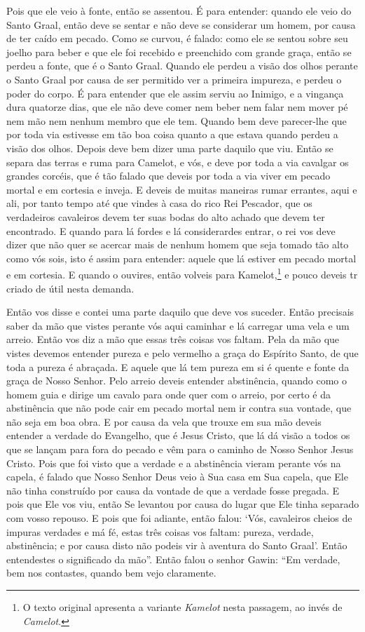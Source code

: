 Pois que ele veio à fonte, então se assentou. É para entender: quando ele veio
do Santo Graal, então deve se sentar e não deve se considerar um homem, por
causa de ter caído em pecado. Como se curvou, é falado: como ele se sentou
sobre seu joelho para beber e que ele foi recebido e preenchido com grande
graça, então se perdeu a fonte, que é o Santo Graal. Quando ele perdeu a visão
dos olhos perante o Santo Graal por causa de ser permitido ver a primeira
impureza, e perdeu o poder do corpo. É para entender que ele assim serviu ao
Inimigo, e a vingança dura quatorze dias, que ele não deve comer nem beber nem
falar nem mover pé nem mão nem nenhum membro que ele tem. Quando bem deve
parecer-lhe que por toda via estivesse em tão boa coisa quanto a que estava
quando perdeu a visão dos olhos. Depois deve bem dizer uma parte daquilo que
viu. Então se separa das terras e ruma para Camelot, e vós, e deve por toda a
via cavalgar os grandes corcéis, que é tão falado que deveis por toda a via
viver em pecado mortal e em cortesia e inveja. E deveis de muitas maneiras
rumar errantes, aqui e ali, por tanto tempo até que vindes à casa do rico Rei
Pescador, que os verdadeiros cavaleiros devem ter suas bodas do alto achado que
devem ter encontrado. E quando para lá fordes e lá considerardes entrar, o rei
vos deve dizer que não quer se acercar mais de nenhum homem que seja tomado tão
alto como vós sois, isto é assim para entender: aquele que lá estiver em pecado
mortal e em cortesia. E quando o ouvires, então volveis para Kamelot,\footnote{
O texto original apresenta a variante \textit{Kamelot} nesta passagem, ao invés
de \textit{Camelot}.} e pouco deveis tr criado de útil nesta demanda. 

 Então vos disse e contei uma parte daquilo que deve vos suceder. Então
precisais saber da mão que vistes perante vós aqui caminhar e lá carregar uma
vela e um arreio. Então vos diz a mão que essas três coisas vos faltam. Pela da
mão que vistes devemos entender pureza e pelo vermelho a graça do Espírito
Santo, de que toda a pureza é abraçada. E aquele que lá tem pureza em si é
quente e fonte da graça de Nosso Senhor. Pelo arreio deveis entender
abstinência, quando como o homem guia e dirige um cavalo para onde quer com o
arreio, por certo é da abstinência que não pode cair em pecado mortal nem ir
contra sua vontade, que não seja em boa obra. E por causa da vela que trouxe em
sua mão deveis entender a verdade do Evangelho, que é Jesus Cristo, que lá dá
visão a todos os que se lançam para fora do pecado e vêm para o caminho de
Nosso Senhor Jesus Cristo. Pois que foi visto que a verdade e a abstinência
vieram perante vós na capela, é falado que Nosso Senhor Deus veio à Sua casa em
Sua capela, que Ele não tinha construído por causa da vontade de que a verdade
fosse pregada. E pois que Ele vos viu, então Se levantou por causa do lugar que
Ele tinha separado com vosso repouso. E pois que foi adiante, então falou:
‘Vós, cavaleiros cheios de impuras verdades e má fé, estas três coisas vos
faltam: pureza, verdade, abstinência; e por causa disto não podeis vir à
aventura do Santo Graal’. Então entendestes o significado da mão”. 
Então falou o senhor Gawin: “Em verdade, bem nos contastes, quando
bem vejo claramente.

